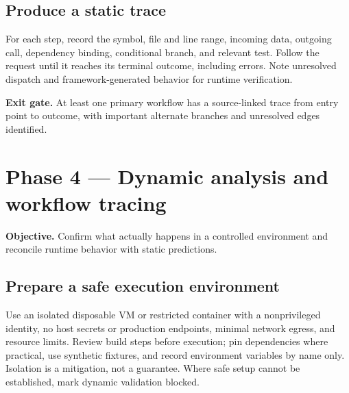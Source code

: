 \documentclass[11pt,letterpaper]{article}
\newcommand{\gate}[1]{\par\noindent\colorbox{pale}{\parbox{\dimexpr\linewidth-2\fboxsep\relax}{\textbf{\color{teal}Exit gate.} #1}}\par}
\begin{document}
\subsection{Produce a static trace}
For each step, record the symbol, file and line range, incoming data, outgoing call, dependency binding, conditional branch, and relevant test. Follow the request until it reaches its terminal outcome, including errors. Note unresolved dispatch and framework-generated behavior for runtime verification.
\gate{At least one primary workflow has a source-linked trace from entry point to outcome, with important alternate branches and unresolved edges identified.}
\clearpage
\section{Phase 4 --- Dynamic analysis and workflow tracing}
\textbf{Objective.} Confirm what actually happens in a controlled environment and reconcile runtime behavior with static predictions.
\subsection{Prepare a safe execution environment}
Use an isolated disposable VM or restricted container with a nonprivileged identity, no host secrets or production endpoints, minimal network egress, and resource limits. Review build steps before execution; pin dependencies where practical, use synthetic fixtures, and record environment variables by name only. Isolation is a mitigation, not a guarantee. Where safe setup cannot be established, mark dynamic validation blocked.
\end{document}
